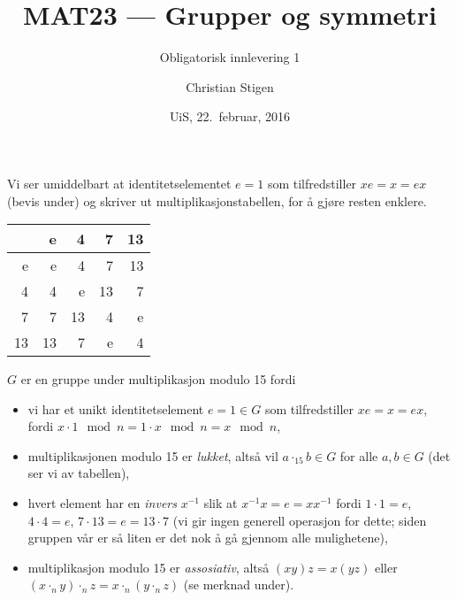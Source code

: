 \documentclass[a4paper,norsk,12pt]{article}
\title{MAT23   --- Grupper og symmetri}
\subtitle{Obligatorisk innlevering 1}
\author{Christian Stigen}
\date{UiS, 22.~februar, 2016}
\begin{document}
\maketitle

Vi ser umiddelbart at identitetselementet $e=1$ som tilfredstiller $xe=x=ex$
(bevis under) og skriver ut multiplikasjonstabellen, for å gjøre resten
enklere.

\begin{table}[htp]
  \centering
  \begin{tabular}{r|rrrr}
       &  e &  4 &  7 & 13 \\ \hline
     e &  e &  4 &  7 & 13 \\
     4 &  4 &  e & 13 &  7 \\
     7 &  7 & 13 &  4 &  e \\
    13 & 13 &  7 &  e &  4 \\
  \end{tabular}
\end{table}

$G$ er en gruppe under multiplikasjon modulo 15 fordi
\begin{itemize}
  \item vi har et unikt identitetselement $e=1 \in G$ som tilfredstiller
    $xe=x=ex$, fordi $x\cdot1 \mod{n} = 1\cdot x \mod{n} = x \mod{n}$,
  \item multiplikasjonen modulo 15 er \textit{lukket}, altså vil $a\cdot_{15} b
    \in G$ for alle $a,b \in G$ (det ser vi av tabellen),
  \item hvert element har en \textit{invers} $x^{-1}$ slik at
    $x^{-1}x=e=xx^{-1}$ fordi $1\cdot1=e$, $4\cdot4=e$, $7\cdot13=e=13\cdot7$
    (vi gir ingen generell operasjon for dette; siden gruppen vår er så liten
    er det nok å gå gjennom alle mulighetene),
  \item multiplikasjon modulo 15 er \textit{assosiativ}, altså $(xy)z = x(yz)$
    eller $(x\cdot_n y)\cdot_n z = x\cdot_n(y\cdot_n z)$ (se merknad under).
\end{itemize}
\end{document}
